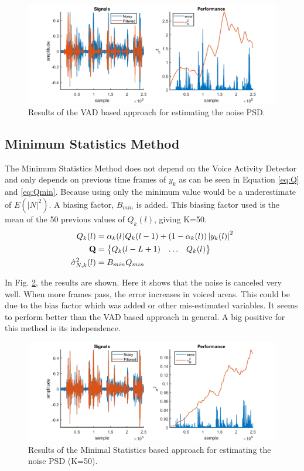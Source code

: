\begin{figure}[h]
  \centering
  \includegraphics[width=\textwidth]{images/noisepsd.png}
  \caption{Results of the VAD based approach for estimating the noise PSD.}
  \label{fig:VADnoise}
\end{figure}

\clearpage

\subsection{Minimum Statistics Method}
The Minimum Statistics Method does not depend on the Voice Activity Detector and only depends on previous time frames of $y_{k}$ as can be seen in Equation \ref{eq:Q} and \ref{eq:Qmin}. Because using only the minimum value would be a underestimate of $E(|N|^2)$. A biasing factor, $B_{min}$ is added. This biasing factor used is the mean of the 50 previous values of $Q_k(l)$, giving K=50.
\begin{align}
Q_{k}(l) &= \alpha_k(l)Q_k(l-1)+(1-\alpha_k(l))\abs{y_{k}(l)}^{2}\label{eq:Qk} \\
  \mathbf{Q} &=
  \begin{Bmatrix}
    Q_{k}(l-L+1) & \hdots & Q_{k}(l)
  \end{Bmatrix}
  \label{eq:Q} \\
  \hat \sigma_{N,k}^{2}(l) &= B_{min}Q_{min}
  \label{eq:Qmin}\\
\end{align}

In Fig. \ref{fig:minstatnoise}, the results are shown. Here it shows that the noise is canceled very well. When more frames pass, the error increases in voiced areas. This could be due to the bias factor which was added or other mis-estimated variables. It seems to perform better than the VAD based approach in general. A big positive for this method is its independence.

\begin{figure}[h]
  \centering
  \includegraphics[width=\textwidth]{images/msmethod.png}
  \caption{Results of the Minimal Statistics based approach for estimating the noise PSD (K=50).}
  \label{fig:minstatnoise}
\end{figure}

